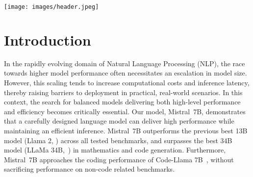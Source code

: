 \documentclass{article}
\title{\mistral}
\author{Albert Q. Jiang, Alexandre Sablayrolles, Arthur Mensch, Chris Bamford, \\
\textbf{Devendra Singh Chaplot, Diego de las Casas, Florian Bressand, Gianna Lengyel,}\\
\textbf{Guillaume Lample, Lucile Saulnier, Lélio Renard Lavaud, Marie-Anne Lachaux,} \\
\textbf{Pierre Stock, Teven Le Scao, Thibaut Lavril, Thomas Wang, Timothée Lacroix,}\\
\textbf{William El Sayed}\\
}
\def\llama{Llama\xspace}
\def\mistral{Mistral~7B\xspace}
\def\mistralchat{Mistral~7B~--~Instruct\xspace}
\begin{document}
\maketitle


\begin{center}
\vspace{-30pt}
\centering
\texttt{[image: images/header.jpeg]}
\end{center}


\begin{abstract}
We introduce \mistral, a 7--billion-parameter language model engineered for superior performance and efficiency.
\mistral outperforms the best open 13B model (Llama 2) across all evaluated benchmarks, and the best released 34B model (Llama 1) in reasoning, mathematics, and code generation.
Our model leverages grouped-query attention (GQA) for faster inference, coupled with sliding window attention (SWA) to effectively handle sequences of arbitrary length with a reduced inference cost.
We also provide a model fine-tuned to follow instructions, \mistralchat, that surpasses \llama~2~13B~--~chat model both on human and automated benchmarks.
Our models are released under the Apache 2.0 license.\\
\textbf{Code:} \url{https://github.com/mistralai/mistral-src} \\
\textbf{Webpage:} \url{https://mistral.ai/news/announcing-mistral-7b/}
\end{abstract}


\section{Introduction}

 In the rapidly evolving domain of Natural Language Processing (NLP), the race towards higher model performance often necessitates an escalation in model size.
However, this scaling tends to increase computational costs and inference latency, thereby raising barriers to deployment in practical, real-world scenarios.
In this context, the search for balanced models delivering both high-level performance and efficiency becomes critically essential.
Our model, \mistral, demonstrates that a carefully designed language model can deliver high performance while maintaining an efficient inference.
\mistral outperforms the previous best 13B model (Llama 2, \cite{touvron2023llama2}) across all tested benchmarks, and surpasses the best 34B model (LLaMa 34B,~\cite{touvron2023llama}) in mathematics and code generation.
Furthermore, \mistral approaches the coding performance of Code-\llama 7B~\cite{roziere2023code}, without sacrificing performance on non-code related benchmarks.
\end{document}
